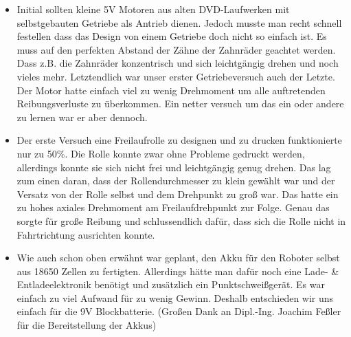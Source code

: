 \begin{flushleft}
    \begin{itemize}
    \item   Initial sollten kleine 5V Motoren aus alten DVD-Laufwerken mit selbstgebauten Getriebe als Antrieb dienen.
            Jedoch musste man recht schnell festellen dass das Design von einem Getriebe doch nicht so einfach ist.
            Es muss auf den perfekten Abstand der Zähne der Zahnräder geachtet werden. Dass z.B. die Zahnräder konzentrisch und 
            sich leichtgängig drehen und noch vieles mehr. Letztendlich war unser erster Getriebeversuch auch der Letzte.
            Der Motor hatte einfach viel zu wenig Drehmoment um alle auftretenden Reibungsverluste zu überkommen.
            Ein netter versuch um das ein oder andere zu lernen war er aber dennoch.

    \item   Der erste Versuch eine Freilaufrolle zu designen und zu drucken funktionierte nur zu 50\%.
            Die Rolle konnte zwar ohne Probleme gedruckt werden, allerdings konnte sie sich nicht frei und leichtgängig genug drehen.
            Das lag zum einen daran, dass der Rollendurchmesser zu klein gewählt war und der Versatz von der Rolle selbst und dem Drehpunkt zu groß war.
            Das hatte ein zu hohes axiales Drehmoment am Freilaufdrehpunkt zur Folge. 
            Genau das sorgte für große Reibung und schlussendlich dafür, dass sich die Rolle nicht in Fahrtrichtung ausrichten konnte.

    \item   Wie auch schon oben erwähnt war geplant, den Akku für den Roboter selbst aus 18650 Zellen zu fertigten.
            Allerdings hätte man dafür noch eine Lade- \& Entladeelektronik benötigt und zusätzlich ein Punktschweißgerät.
            Es war einfach zu viel Aufwand für zu wenig Gewinn. Deshalb entschieden wir uns einfach für die 9V Blockbatterie.
            (Großen Dank an Dipl.-Ing. Joachim Feßler für die Bereitstellung der Akkus)

    \end{itemize}
\end{flushleft}